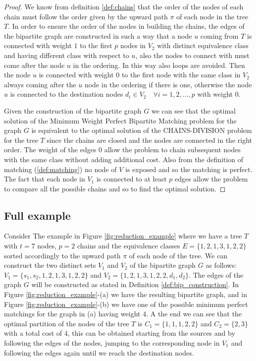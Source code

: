 \begin{proof}
    We know from definition \ref{def:chains} that the order of the nodes of each chain must follow the order given by the upward path $\pi$ of each node in the tree $T$. In order to ensure the order of the nodes in building the chains, the edges of the bipartite graph are constructed in such a way that a node $u$ coming from $T$ is connected with weight $1$ to the first $p$ nodes in $V_2$ with distinct equivalence class and having different class with respect to $u$, also the nodes to connect with must come after the node $u$ in the ordering. In this way also loops are avoided. Then the node $u$ is connected with weight $0$ to the first node with the same class in $V_2$ always coming after the $u$ node in the ordering if there is one, otherwise the node $u$ is connected to the destination nodes $d_i \in V_2 \quad \forall i = 1, 2, \dots, p$ with weight $0$. 

    Given the construction of the bipartite graph $G$ we can see that the optimal solution of the Minimum Weight Perfect Bipartite Matching problem for the graph $G$ is equivalent to the optimal solution of the \textsc{CHAINS-DIVISION} problem for the tree $T$ since the chains are closed and the nodes are connected in the right order. The weight of the edges $0$ allow the problem to chain subsequent nodes with the same class without adding additional cost. Also from the definition of matching (\ref{def:matching}) no node of $V$ is exposed and so the matching is perfect. The fact that each node in $V_1$ is connected to at least $p$ edges allow the problem to compare all the possible chains and so to find the optimal solution.
\end{proof}

\subsection{Full example}
Consider The example in Figure \ref{fig:reduction_example} where we have a tree $T$ with $t=7$ nodes, $p = 2$ chains and the equivalence classes $E = \{1,2,1,3,1,2,2\}$ sorted accordingly to the upward path $\pi$ of each node of the tree. We can construct the two distinct sets $V_1$ and $V_2$ of the bipartite graph $G$ as follows: $V_1 = \{s_1, s_2, 1,2,1,3,1,2,2\}$ and $V_2 = \{1,2,1,3,1,2,2, d_1, d_2\}$. The edges of the graph $G$ will be constructed as stated in Definition \ref{def:bip_construction}. In Figure \ref{fig:reduction_example}-(a) we have the resulting bipartite graph, and in Figure \ref{fig:reduction_example}-(b) we have one of the possible minimum perfect matchings for the graph in (a) having weight $4$. A the end we can see that the optimal partition of the nodes of the tree $T$ is $C_1 = \{1,1,1,2,2\}$ and $C_2 = \{2,3\}$ with a total cost of $4$, this can be obtained starting from the sources and by following the edges of the nodes, jumping to the corresponding node in $V_1$ and following the edges again until we reach the destination nodes.

